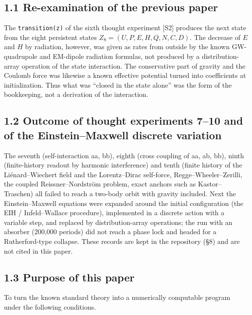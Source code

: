 \documentclass[
  a4paper,
]{article}
\begin{document}
\subsection{1.1 Re-examination of the previous
paper}\label{re-examination-of-the-previous-paper}

The \texttt{transition(z)} of the sixth thought experiment {[}S2{]}
produces the next state from the eight persistent states
\(Z_8=(U,P,E,H,Q,N,C,D)\). The decrease of \(E\) and \(H\) by radiation,
however, was given as rates from outside by the known GW-quadrupole and
EM-dipole radiation formulas, not produced by a distribution-array
operation of the state interaction. The conservative part of gravity and
the Coulomb force was likewise a known effective potential turned into
coefficients at initialization. Thus what was ``closed in the state
alone'' was the form of the bookkeeping, not a derivation of the
interaction.

\subsection{1.2 Outcome of thought experiments 7--10 and of the
Einstein--Maxwell discrete
variation}\label{outcome-of-thought-experiments-710-and-of-the-einsteinmaxwell-discrete-variation}

The seventh (self-interaction aa, bb), eighth (cross coupling of aa, ab,
bb), ninth (finite-history readout by harmonic interference) and tenth
(finite history of the Liénard--Wiechert field and the Lorentz--Dirac
self-force, Regge--Wheeler--Zerilli, the coupled Reissner--Nordström
problem, exact anchors such as Kastor--Traschen) all failed to reach a
two-body orbit with gravity included. Next the Einstein--Maxwell
equations were expanded around the initial configuration (the EIH /
Infeld--Wallace procedure), implemented in a discrete action with a
variable step, and replaced by distribution-array operations; the run
with an absorber (200,000 periods) did not reach a phase lock and headed
for a Rutherford-type collapse. These records are kept in the repository
(§8) and are not cited in this paper.

\subsection{1.3 Purpose of this paper}\label{purpose-of-this-paper}

To turn the known standard theory into a numerically computable program
under the following conditions.
\end{document}
